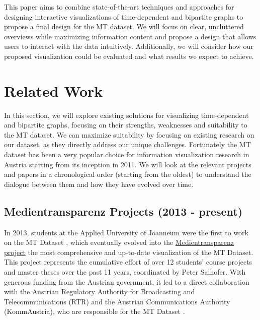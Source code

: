 \documentclass{vgtc}                          %
\begin{document}
\medskip

This paper aims to combine state-of-the-art techniques and approaches for designing interactive visualizations of time-dependent and bipartite graphs to propose a final design for the MT dataset. We will focus on clear, uncluttered overviews while maximizing information content and propose a design that allows users to interact with the data intuitively. Additionally, we will consider how our proposed visualization could be evaluated and what results we expect to achieve.











\section{Related Work} %


In this section, we will explore existing solutions for visualizing time-dependent and bipartite graphs, focusing on their strengths, weaknesses and suitability to the MT dataset.
We can maximize suitability by focusing on existing research on our dataset, as they directly address our unique challenges. Fortunately the MT dataset has been a very popular choice for information visualization research in Austria starting from its inception in 2011. We will look at the relevant projects and papers in a chronological order (starting from the oldest) to understand the dialogue between them and how they have evolved over time.

\subsection{Medientransparenz Projects (2013 - present)}

In 2013, students at the Applied University of Joanneum were the first to work on the MT Dataset \cite{medtrans}, which eventually evolved into the \href{https://visualisierung.medientransparenz.rtr.at/}{Medientransparenz project} \textendash{} the most comprehensive and up-to-date visualization of the MT Dataset. This project represents the cumulative effort of over 12 students' course projects and master theses over the past 11 years, coordinated by Peter Salhofer. With generous funding from the Austrian government, it led to a direct collaboration with the Austrian Regulatory Authority for Broadcasting and Telecommunications (RTR) and the Austrian Communications Authority (KommAustria), who are responsible for the MT Dataset \cite{dataset}.
\end{document}
